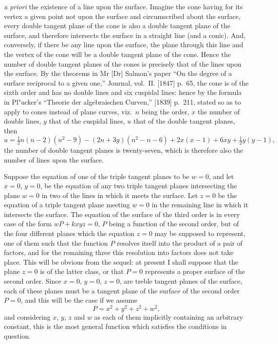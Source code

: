 \documentclass[11pt,a4paper]{book}
\begin{document}
\newpage

\setcounter{page}{446}

\textit{a priori} the existence of a line upon the surface. Imagine the cone having for its vertex a given point not upon the surface and circumscribed about the surface, every double tangent plane of the cone is also a double tangent plane of the surface, and therefore intersects the surface in a straight line (and a conic). And, conversely, if there be any line upon the surface, the plane through this line and the vertex of the cone will be a double tangent plane of the cone. Hence the number of double tangent planes of the cones is precisely that of the lines upon the surface. By the theorems in Mr [Dr] Salmon's paper ``On the degree of a surface reciprocal to a given one,'' Journal, vol.~II. [1847] p.~65, the cone is of the sixth order and has no double lines and six cuspidal lines: hence by the formula in Pl"{u}cker's ``Theorie der algebraischen Curven,'' [1839] p.~211, stated so as to apply to cones instead of plane curves, viz.\ $n$ being the order, $x$ the number of double lines, $y$ that of the cuspidal lines, $u$ that of the double tangent planes, then
\[
u = \tfrac{1}{2}n(n-2)(n^{2}-9) - (2n + 3y)(n^{2}-n-6) + 2x(x-1) + 6xy + \tfrac{1}{2}y(y-1),
\]
the number of double tangent planes is twenty-seven, which is therefore also the number of lines upon the surface.

Suppose the equation of one of the triple tangent planes to be $w = 0$, and let $x = 0$, $y = 0$, be the equation of any two triple tangent planes intersecting the plane $w = 0$ in two of the lines in which it meets the surface. Let $z = 0$ be the equation of a triple tangent plane meeting $w = 0$ in the remaining line in which it intersects the surface. The equation of the surface of the third order is in every case of the form $wP + kxyz = 0$, $P$ being a function of the second order, but of the four different planes which the equation $z = 0$ may be supposed to represent, one of them such that the function $P$ resolves itself into the product of a pair of factors, and for the remaining three this resolution into factors does not take place. This will be obvious from the sequel: at present I shall suppose that the plane $z = 0$ is of the latter class, or that $P = 0$ represents a proper surface of the second order. Since $x = 0$, $y = 0$, $z = 0$, are treble tangent planes of the surface, each of these planes must be a tangent plane of the surface of the second order $P = 0$, and this will be the case if we assume
\[
P = x^{2} + y^{2} + z^{2} + w^{2},
\]
and considering $x$, $y$, $z$ and $w$ as each of them implicitly containing an arbitrary constant, this is the most general function which satisfies the conditions in question.
\end{document}
